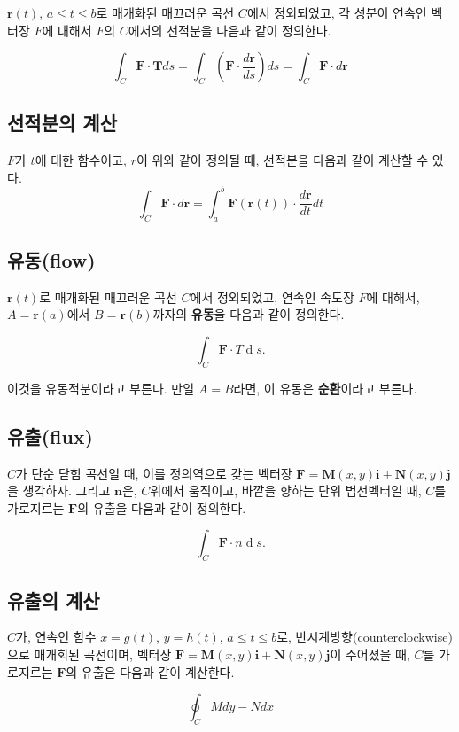 \documentclass[chapter, oneside]{oblivoir}
\newcommand{\dx}[1]{\operatorname{d}\! #1}
\newcommand{\term}[1]{\textbf{#1}}
\begin{document}
$\textbf{r}(t)$, $a \le t \le b$로 매개화된 매끄러운 곡선 $C$에서 정외되었고, 각 성분이 연속인 벡터장 $F$에 대해서 $F$의  $C$에서의 선적분을 다음과 같이 정의한다.

$$ \int_{C} \textbf{F} \cdot \textbf{T} ds = \int_{C} \left( \textbf{F} \cdot \frac{d \textbf{r}}{ds} \right) ds = \int_{C} \textbf{F} \cdot d\textbf{r}$$


\subsection{선적분의 계산}
$F$가 $t$애 대한 함수이고, $r$이 위와 같이 정의될 때, 선적분을 다음과 같이 계산할 수 있다.
$$ \int_{C} \textbf{F} \cdot d\textbf{r} = \int_a^b \textbf{F}(\textbf{r}(t)) \cdot \frac{d\textbf{r}}{dt} dt $$


\subsection{유동(flow)}
$\textbf{r}(t)$로 매개화된 매끄러운 곡선 $C$에서 정외되었고, 연속인 속도장 $F$에 대해서, $A=\textbf{r}(a)$에서 $B=\textbf{r}(b)$까자의 \term{유동}을 다음과 같이 정의한다.

$$ \int _{C} \textbf{F} \cdot {T} \dx{s}.$$

이것을 유동적분이라고 부른다. 만일 $A=B$라면, 이 유동은 \term{순환}이라고 부른다. 


\subsection{유출(flux)}
$C$가 단순 닫힘 곡선일 때, 이를 정의역으로 갖는 벡터장 $\textbf{F}  = \textbf{M}(x,y)\textbf{i} + \textbf{N}(x,y)\textbf{j}$을 생각하자. 그리고 $\textbf{n}$은, $C$위에서 움직이고, 바깥을 향하는 단위 법선벡터일 때, $C$를 가로지르는 $\textbf{F}$의 유출을 다음과 같이 정의한다.

$$ \int _{C} \textbf{F} \cdot {n} \dx{s}.$$



\subsection{유출의 계산}
$C$가, 연속인 함수 $x=g(t)$, $y=h(t)$, $a \le t \le b$로, 반시계방향(counterclockwise)으로 매개회된 곡선이며, 
벡터장 $\textbf{F}  = \textbf{M}(x,y)\textbf{i} + \textbf{N}(x,y)\textbf{j}$이 주어졌을 때,
$C$를 가로지르는 $\textbf{F} $의 유출은 다음과 같이 계산한다.

$$\oint_{C} M dy - N dx$$
\end{document}
